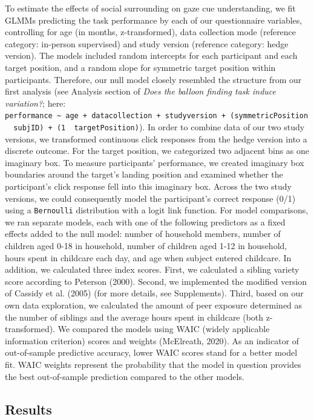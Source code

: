 \documentclass[
  man,floatsintext]{apa6}
\begin{document}
To estimate the effects of social surrounding on gaze cue understanding, we fit GLMMs predicting the task performance by each of our questionnaire variables, controlling for age (in months, z-transformed), data collection mode (reference category: in-person supervised) and study version (reference category: hedge version). The models included random intercepts for each participant and each target position, and a random slope for symmetric target position within participants. Therefore, our null model closely resembled the structure from our first analysis (see Analysis section of \emph{Does the balloon finding task induce variation?}; here: \texttt{performance\ \textasciitilde{}\ age\ +\ datacollection\ +\ studyversion\ +\ (symmetricPosition\ \textbar{}\ subjID)\ +\ (1\ \textbar{}\ targetPosition)}).
In order to combine data of our two study versions, we transformed continuous click responses from the hedge version into a discrete outcome. For the target position, we categorized two adjacent bins as one imaginary box. To measure participants' performance, we created imaginary box boundaries around the target's landing position and examined whether the participant's click response fell into this imaginary box. Across the two study versions, we could consequently model the participant's correct response (0/1) using a \texttt{Bernoulli} distribution with a logit link function.
For model comparisons, we ran separate models, each with one of the following predictors as a fixed effects added to the null model: number of household members, number of children aged 0-18 in household, number of children aged 1-12 in household, hours spent in childcare each day, and age when subject entered childcare.
In addition, we calculated three index scores. First, we calculated a sibling variety score according to Peterson (2000). Second, we implemented the modified version of Cassidy et al. (2005) (for more details, see Supplements). Third, based on our own data exploration, we calculated the amount of peer exposure determined as the number of siblings and the average hours spent in childcare (both z-transformed).
We compared the models using WAIC (widely applicable information criterion) scores and weights (McElreath, 2020). As an indicator of out-of-sample predictive accuracy, lower WAIC scores stand for a better model fit. WAIC weights represent the probability that the model in question provides the best out-of-sample prediction compared to the other models.

\hypertarget{results-2}{%
\subsection{Results}\label{results-2}}
\end{document}
